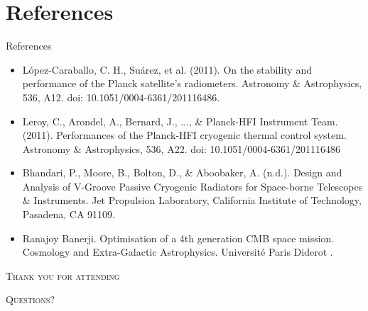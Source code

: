 \documentclass{cubeamer}
\begin{document}
\section{References}
\begin{frame}{References}
\begin{itemize}
\small
    \item López-Caraballo, C. H., Suárez, et al. (2011). On the stability and performance of the Planck satellite’s radiometers. Astronomy \& Astrophysics, 536, A12. doi: 10.1051/0004-6361/201116486.
    \item Leroy, C., Arondel, A., Bernard, J., ..., \& Planck-HFI Instrument Team. (2011). Performances of the Planck-HFI cryogenic thermal control system. Astronomy \& Astrophysics, 536, A22. doi: 10.1051/0004-6361/201116486
    \item Bhandari, P., Moore, B., Bolton, D., \& Aboobaker, A. (n.d.). Design and Analysis of V-Groove Passive Cryogenic Radiators for Space-borne Telescopes \& Instruments. Jet Propulsion Laboratory, California Institute of Technology, Pasadena, CA 91109.
    \item Ranajoy Banerji. Optimisation of a 4th generation CMB space mission. Cosmology and Extra-Galactic Astrophysics. Université Paris Diderot .
\end{itemize}
\end{frame}

 

\begin{frame}[standout]
    \Huge\textsc{Thank you for attending}
    
    \vfill
    
    \LARGE\textsc{Questions?}
\end{frame}
\end{document}
